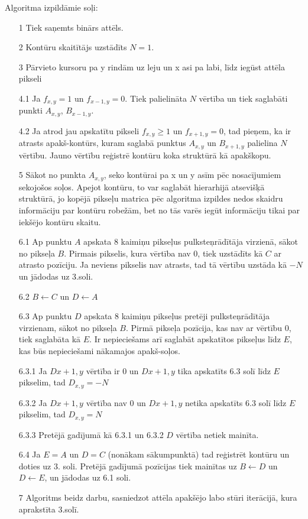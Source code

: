 \documentclass[12pt, a4paper, oneside, openright]{article}
\begin{document}
Algoritma izpildāmie soļi:
\begin{enumerate}
\item[1] Tiek saņemts binārs attēls.
\item[2] Kontūru skaitītājs uzstādīts $N=1$.
\item[3] Pārvieto kursoru pa y rindām uz leju un x asi pa labi, līdz iegūst attēla pikseli
\item[4.1] Ja $f_{x,y} = 1$ un $f_{x-1,y}=0$. Tiek palielināta $N$ vērtība un tiek saglabāti punkti $A_{x,y}$, $B_{x-1,y}$.
\item[4.2] Ja atrod jau apskatītu pikseli $f_{x,y} \geqslant 1$ un $f_{x+1,y}=0$, tad pieņem, ka ir atrasts apakš-kontūrs, kuram
saglabā punktus $A_{x,y}$ un $B_{x+1,y}$ palielina $N$ vērtību. Jauno vērtību reģistrē kontūru koka struktūrā kā apakškopu.
\item[5] Sākot no punkta $A_{x,y}$, seko kontūrai pa x un y asīm pēc nosacījumiem sekojošos soļos. Apejot kontūru, to var saglabāt hierarhijā atsevišķā struktūrā,
jo kopējā pikseļu matrica pēc algoritma izpildes nedos skaidru informāciju par kontūru robežām, bet no tās varēs iegūt informāciju tikai par iekšējo kontūru skaitu.
\item[6.1] Ap punktu $A$ apskata 8 kaimiņu pikseļus pulksteņrādītāja virzienā, sākot no pikseļa $B$. Pirmais pikselis, kura
vērtība nav 0, tiek uzstādīts kā $C$ ar atrasto pozīciju. Ja neviens pikselis nav atrasts, tad tā vērtību uzstāda kā $-N$ un jādodas uz 3.soli. 
\item[6.2] $B \leftarrow C$ un $D \leftarrow A$
\item[6.3] Ap punktu $D$ apskata 8 kaimiņu pikseļus pretēji pulksteņrādītāja virzienam, sākot no pikseļa $B$. 
Pirmā pikseļa pozīcija, kas nav ar vērtību 0, tiek saglabāta kā $E$. Ir nepieciešams arī saglabāt apskatītos pikseļus līdz $E$, kas būs nepieciešami nākamajos apakš-soļos.
\item[6.3.1] Ja $D{x+1,y}$ vērtība ir 0 un $D{x+1,y}$ tika apskatīts 6.3 solī līdz $E$ pikselim, tad $D_{x,y} = -N$
\item[6.3.2] Ja $D{x+1,y}$ vērtība nav 0 un $D{x+1,y}$ netika apskatīts 6.3 solī līdz $E$ pikselim, tad $D_{x,y} = N$
\item[6.3.3] Pretējā gadījumā kā 6.3.1 un 6.3.2 $D$ vērtība netiek mainīta.
\item[6.4] Ja $E = A$ un $D = C$ (nonākam sākumpunktā) tad reģistrēt kontūru un doties uz 3. soli. Pretējā gadījumā 
pozīcijas tiek mainītas uz $B \leftarrow D$ un $D \leftarrow E$, un jādodas uz 6.1 soli.
\item[7] Algoritms beidz darbu, sasniedzot attēla apakšējo labo stūri iterācijā, kura aprakstīta 3.solī.
\end{enumerate}
\end{document}
